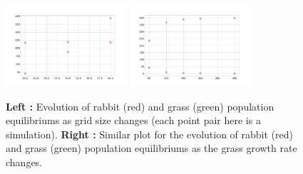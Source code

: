 \documentclass[11pt]{article}
\begin{document}
\begin{figure}[h!]
  \centering
  \includegraphics[width=0.4\textwidth]{plots/gSize.png}
  \includegraphics[width=0.4\textwidth]{plots/ggrate.png}
  \caption{\textbf{Left :} Evolution of rabbit (red) and grass (green) population equilibriums as grid size changes (each point pair here is a simulation). \textbf{Right :} Similar plot for the evolution of rabbit (red) and grass (green) population equilibriums as the grass growth rate changes.}
  \label{figure2}
\end{figure}
\end{document}
